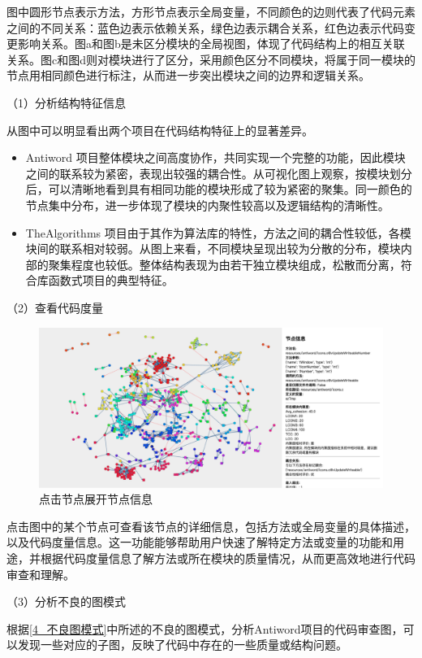 图中圆形节点表示方法，方形节点表示全局变量，不同颜色的边则代表了代码元素之间的不同关系：蓝色边表示依赖关系，绿色边表示耦合关系，红色边表示代码变更影响关系。图a和图b是未区分模块的全局视图，体现了代码结构上的相互关联关系。图c和图d则对模块进行了区分，采用颜色区分不同模块，将属于同一模块的节点用相同颜色进行标注，从而进一步突出模块之间的边界和逻辑关系。

\noindent（1）分析结构特征信息

从图中可以明显看出两个项目在代码结构特征上的显著差异。
\begin{itemize}
    \item Antiword 项目整体模块之间高度协作，共同实现一个完整的功能，因此模块之间的联系较为紧密，表现出较强的耦合性。从可视化图上观察，按模块划分后，可以清晰地看到具有相同功能的模块形成了较为紧密的聚集。同一颜色的节点集中分布，进一步体现了模块的内聚性较高以及逻辑结构的清晰性。
    
    \item TheAlgorithms 项目由于其作为算法库的特性，方法之间的耦合性较低，各模块间的联系相对较弱。从图上来看，不同模块呈现出较为分散的分布，模块内部的聚集程度也较低。整体结构表现为由若干独立模块组成，松散而分离，符合库函数式项目的典型特征。
\end{itemize}

\noindent（2）查看代码度量

\begin{figure}[h]
\centering
\includegraphics[width = 1\textwidth]{figures/点击节点查看.png}
\caption{点击节点展开节点信息}
\end{figure}

 点击图中的某个节点可查看该节点的详细信息，包括方法或全局变量的具体描述，以及代码度量信息。这一功能能够帮助用户快速了解特定方法或变量的功能和用途，并根据代码度量信息了解方法或所在模块的质量情况，从而更高效地进行代码审查和理解。

\noindent（3）分析不良的图模式

根据\ref{4_不良图模式}中所述的不良的图模式，分析Antiword项目的代码审查图，可以发现一些对应的子图，反映了代码中存在的一些质量或结构问题。


